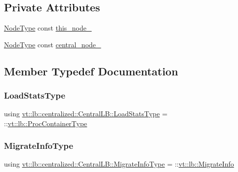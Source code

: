 \subsection*{Private Attributes}
\begin{DoxyCompactItemize}
\item 
\hyperlink{namespacevt_a866da9d0efc19c0a1ce79e9e492f47e2}{Node\+Type} const \hyperlink{structvt_1_1lb_1_1centralized_1_1_central_l_b_ad51aece8aaaf52ed264e9da3fb49685d}{this\+\_\+node\+\_\+}
\item 
\hyperlink{namespacevt_a866da9d0efc19c0a1ce79e9e492f47e2}{Node\+Type} const \hyperlink{structvt_1_1lb_1_1centralized_1_1_central_l_b_a29f472582bf7ea12a23979ae366e6b9b}{central\+\_\+node\+\_\+}
\end{DoxyCompactItemize}


\subsection{Member Typedef Documentation}
\mbox{\label{structvt_1_1lb_1_1centralized_1_1_central_l_b_aafbf9d4fbe90a3561fd812661c970b2d}} 
\subsubsection{\texorpdfstring{Load\+Stats\+Type}{LoadStatsType}}
{\footnotesize\ttfamily using \hyperlink{structvt_1_1lb_1_1centralized_1_1_central_l_b_aafbf9d4fbe90a3561fd812661c970b2d}{vt\+::lb\+::centralized\+::\+Central\+L\+B\+::\+Load\+Stats\+Type} =  \+::\hyperlink{namespacevt_1_1lb_af7c6ee21a7b3966b7ab64c5b626d30f8}{vt\+::lb\+::\+Proc\+Container\+Type}}

\mbox{\label{structvt_1_1lb_1_1centralized_1_1_central_l_b_a8d393c0126180fb8cce2b881c23df44f}} 
\subsubsection{\texorpdfstring{Migrate\+Info\+Type}{MigrateInfoType}}
{\footnotesize\ttfamily using \hyperlink{structvt_1_1lb_1_1centralized_1_1_central_l_b_a8d393c0126180fb8cce2b881c23df44f}{vt\+::lb\+::centralized\+::\+Central\+L\+B\+::\+Migrate\+Info\+Type} =  \+::\hyperlink{structvt_1_1lb_1_1_migrate_info}{vt\+::lb\+::\+Migrate\+Info}}



